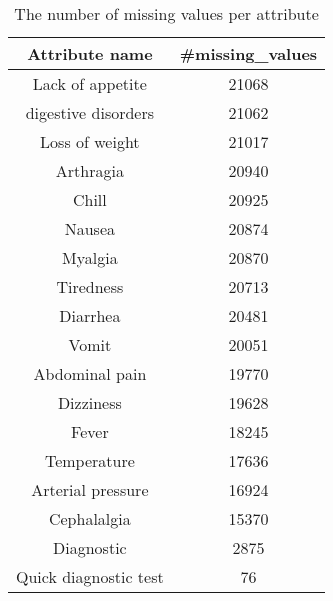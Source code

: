 \begin{table}[!ht]
\centering
\begin{tabular}{cc}
\textbf{Attribute name} & \textbf{\#missing\_values}\\
\toprule
Lack of appetite &    21068 \\
digestive disorders & 21062 \\
Loss of weight &   21017 \\
Arthragia &     20940\\
Chill &      20925\\
Nausea &     20874\\
Myalgia &    20870\\
Tiredness&   20713 \\
Diarrhea &     20481\\
Vomit &        20051 \\
Abdominal pain &  19770 \\
Dizziness &       19628 \\
Fever &        18245 \\
Temperature &     17636 \\
Arterial pressure &    16924 \\
Cephalalgia &       15370 \\
Diagnostic  &     2875 \\
Quick diagnostic test &  76 \\
\bottomrule
\end{tabular}
\vspace*{.5cm}
\caption{The number of missing values per attribute}\label{table-missing}
\end{table} 

